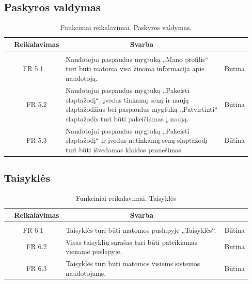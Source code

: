 \documentclass{VUMIFPSkursinis}
\begin{document}
\subsection{Paskyros valdymas}

\begin{table}[H]
	\caption{Funkciniai reikalavimai. Paskyros valdymas.}
	\begin{tabular}{|p{1cm}|p{1cm}|p{}|p{}|}
		\hline 
		\rowcolor{gray!50}
		\multicolumn{2}{|c|}{{\bfseries Kodas}}&
		\multicolumn{1}{c|}{{\bfseries Reikalavimas}}&
		\multicolumn{1}{c|}{{\bfseries Svarba}}\\
		\hline
		\rowcolor{lightgray}
		\multicolumn{4}{|c|}{Paskyros valdymas}\\				
		\hline
		\multicolumn{2}{|c|}{FR 5.1}&
		{Naudotojui paspaudus mygtuką „Mano profilis“ turi būti matoma visa žinoma informacija apie naudotoją.
		}&		
		\multicolumn{1}{c|}{Būtina}\\
		\hline
		\multicolumn{1}{|c}{}&
		\multicolumn{1}{c|}{FR 5.2}&
		{Naudotojui paspaudus mygtuką „Pakeisti slaptažodį“, įvedus tinkamą seną ir naują slaptažodžius bei paspaudus mygtuką „Patvirtinti“ slaptažodis turi būti pakeičiamas į naują.
		}&		
		\multicolumn{1}{c|}{Būtina}\\
		\hline
		\multicolumn{1}{|c}{}&
		\multicolumn{1}{c|}{FR 5.3}&
		{Naudotojui paspaudus mygtuką „Pakeisti slaptažodį“ ir įvedus netinkamą seną slaptažodį turi būti išvedamas klaidos pranešimas.
		}&
		\multicolumn{1}{c|}{Būtina}\\	
		\hline		
	\end{tabular}		
\end{table}

\subsection{Taisyklės}
\begin{table}[H]
	\caption{Funkciniai reikalavimai. Taisyklės}
	\begin{tabular}{|p{1cm}|p{1cm}|p{}|p{}|}
		\hline 
		\rowcolor{gray!50}
		\multicolumn{2}{|c|}{{\bfseries Kodas}}&
		\multicolumn{1}{c|}{{\bfseries Reikalavimas}}&
		\multicolumn{1}{c|}{{\bfseries Svarba}}\\
		\hline
		\rowcolor{lightgray}
		\multicolumn{4}{|c|}{Taisyklės}\\		
		
		\hline
		\multicolumn{2}{|c|}{FR 6.1}&
		{Taisyklės turi būti matomos puslapyje „Taisyklės“.
		}&		
		\multicolumn{1}{c|}{Būtina}\\
		\hline
		\multicolumn{1}{|c}{}&
		\multicolumn{1}{c|}{FR 6.2}&
		{Visas taisyklių sąrašas turi būti pateikiamas viename puslapyje.
		}&		
		\multicolumn{1}{c|}{Būtina}\\
		\hline	
		\multicolumn{1}{|c}{}&
		\multicolumn{1}{c|}{FR 6.3}&
		{Taisyklės turi būti matomos visiems sistemos naudotojams.
		}&
		\multicolumn{1}{c|}{Būtina}\\									
		\hline
	\end{tabular}		
\end{table}
\end{document}
